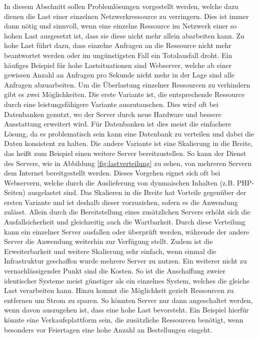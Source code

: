 \documentclass[a4paper, 12pt, BCOR10mm, DIV12, toc=bibliography, toc=listof, german]{scrbook}
\begin{document}
		In diesem Abschnitt sollen Problemlösungen vorgestellt werden, welche dazu dienen die Last einer
		einzelnen Netzwerkressource zu verringern. Dies ist immer dann nötig und sinnvoll, wenn eine
		einzelne Ressource im Netzwerk einer so hohen Last ausgesetzt ist, dass sie diese nicht mehr
		allein abarbeiten kann. Zu hohe Last führt dazu, dass einzelne Anfragen an die Ressource nicht
		mehr beantwortet werden oder im ungünstigsten Fall ein Totalausfall droht. Ein häufiges Beispiel
		für hohe Lastsituationen sind Webserver, welche ab einer gewissen Anzahl an Anfragen pro Sekunde
		nicht mehr in der Lage sind alle Anfragen abzuarbeiten. Um die Überlastung einzelner Ressourcen
		zu verhindern gibt es zwei Möglichkeiten. Die erste Variante ist, die entsprechende Ressource
		durch eine leistungsfähigere Variante auszutauschen. Dies wird oft bei Datenbanken genutzt, wo
		der Server durch neue Hardware und bessere Ausstattung erweitert wird.  Für Datenbanken ist dies
		meist die einfachere Lösung, da es problematisch sein kann eine Datenbank zu verteilen und dabei
		die Daten konsistent zu halten. Die andere Variante ist eine Skalierung in die Breite, das heißt
		zum Beispiel einen weitere Server bereitzustellen. So kann der Dienst des Servers, wie in
		Abbildung \ref{fig:lastverteilung} zu sehen, von mehreren Servern dem Internet bereitgestellt
		werden. Dieses Vorgehen eignet sich oft bei Webservern, welche durch die Auslieferung von
		dynmaischen Inhalten (z.B. PHP-Seiten) ausgelastet sind. Das Skalieren in die Breite hat
		Vorteile gegenüber der ersten Variante und ist deshalb dieser vorzuziehen, sofern es die
		Anwendung zulässt.  Allein durch die Bereitstellung eines zusätzlichen Servers erhöht sich die
		Ausfallsicherheit und gleichzeitig auch die Wartbarkeit.  Durch diese Verteilung kann ein
		einzelner Server ausfallen oder überprüft werden, währende der andere Server die Anwendung
		weiterhin zur Verfügung stellt. Zudem ist die Erweiterbarkeit und weitere Skalierung sehr
		einfach, wenn einmal die Infrastruktur geschaffen wurde mehrere Server zu nutzen. Ein weiterer
		nicht zu vernachlässigender Punkt sind die Kosten. So ist die Anschaffung zweier identischer
		Systeme meist günstiger als ein einzelnes System, welches die gleiche Last verarbeiten kann.
		Hinzu kommt die Möglichkeit gezielt Ressourcen zu entfernen um Strom zu sparen. So könnten
		Server nur dann angeschaltet werden, wenn davon auszugehen ist, dass eine hohe Last bevorsteht.
		Ein Beispiel hierfür könnte eine Verkaufsplattform sein, die zusätzliche Ressourcen benötigt,
		wenn	besonders vor Feiertagen eine hohe Anzahl an Bestellungen eingeht.
\end{document}
